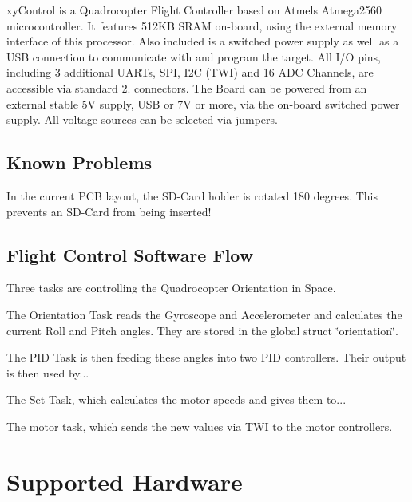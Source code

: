 

xy\-Control is a Quadrocopter Flight Controller based on Atmels Atmega2560 microcontroller. It features 512\-K\-B S\-R\-A\-M on-\/board, using the external memory interface of this processor. Also included is a switched power supply as well as a U\-S\-B connection to communicate with and program the target. All I/\-O pins, including 3 additional U\-A\-R\-Ts, S\-P\-I, I2\-C (T\-W\-I) and 16 A\-D\-C Channels, are accessible via standard 2.\-54mm connectors. The Board can be powered from an external stable 5\-V supply, U\-S\-B or 7\-V or more, via the on-\/board switched power supply. All voltage sources can be selected via jumpers.

\subsection*{Known Problems}

In the current P\-C\-B layout, the S\-D-\/\-Card holder is rotated 180 degrees. This prevents an S\-D-\/\-Card from being inserted!

\subsection*{Flight Control Software Flow}

Three tasks are controlling the Quadrocopter Orientation in Space.


\begin{DoxyItemize}
\item The Orientation Task reads the Gyroscope and Accelerometer and calculates the current Roll and Pitch angles. They are stored in the global struct \char`\"{}orientation\char`\"{}.
\item The P\-I\-D Task is then feeding these angles into two P\-I\-D controllers. Their output is then used by...
\item The Set Task, which calculates the motor speeds and gives them to...
\item The motor task, which sends the new values via T\-W\-I to the motor controllers.
\end{DoxyItemize}

\section*{Supported Hardware}


